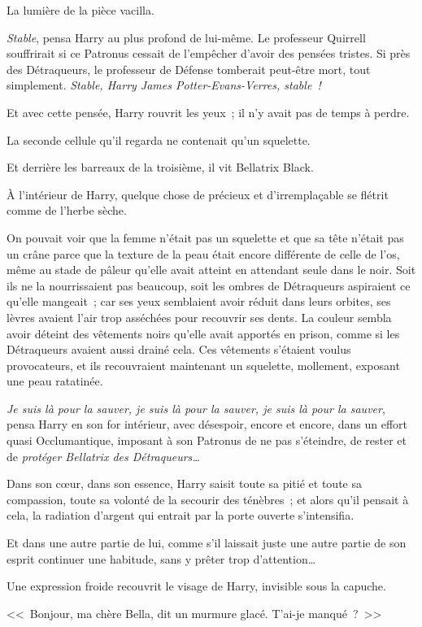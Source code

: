 La lumière de la pièce vacilla.

\emph{Stable}, pensa Harry au plus profond de lui-même. Le professeur Quirrell souffrirait si ce Patronus cessait de l'empêcher d'avoir des pensées tristes. Si près des Détraqueurs, le professeur de Défense tomberait peut-être mort, tout simplement. \emph{Stable, Harry James Potter-Evans-Verres, stable~!}

Et avec cette pensée, Harry rouvrit les yeux~; il n'y avait pas de temps à perdre.

La seconde cellule qu'il regarda ne contenait qu'un squelette.

Et derrière les barreaux de la troisième, il vit Bellatrix Black.

À l'intérieur de Harry, quelque chose de précieux et d'irremplaçable se flétrit comme de l'herbe sèche.

On pouvait voir que la femme n'était pas un squelette et que sa tête n'était pas un crâne parce que la texture de la peau était encore différente de celle de l'os, même au stade de pâleur qu'elle avait atteint en attendant seule dans le noir. Soit ils ne la nourrissaient pas beaucoup, soit les ombres de Détraqueurs aspiraient ce qu'elle mangeait~; car ses yeux semblaient avoir réduit dans leurs orbites, ses lèvres avaient l'air trop asséchées pour recouvrir ses dents. La couleur sembla avoir déteint des vêtements noirs qu'elle avait apportés en prison, comme si les Détraqueurs avaient aussi drainé cela. Ces vêtements s'étaient voulus provocateurs, et ils recouvraient maintenant un squelette, mollement, exposant une peau ratatinée.

\emph{Je suis là pour la sauver, je suis là pour la sauver, je suis là pour la sauver}, pensa Harry en son for intérieur, avec désespoir, encore et encore, dans un effort quasi Occlumantique, imposant à son Patronus de ne pas s'éteindre, de rester et de \emph{protéger Bellatrix des Détraqueurs…}

Dans son cœur, dans son essence, Harry saisit toute sa pitié et toute sa compassion, toute sa volonté de la secourir des ténèbres~; et alors qu'il pensait à cela, la radiation d'argent qui entrait par la porte ouverte s'intensifia.

Et dans une autre partie de lui, comme s'il laissait juste une autre partie de son esprit continuer une habitude, sans y prêter trop d'attention…

Une expression froide recouvrit le visage de Harry, invisible sous la capuche.

<<~Bonjour, ma chère Bella, dit un murmure glacé. T'ai-je manqué~?~>>
